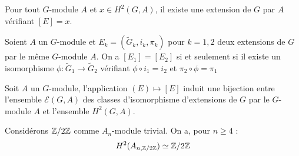 \documentclass{cours}
\begin{document}
\begin{proposition}
    Pour tout $G$-module $A$ et $x \in H^{2}(G, A)$, il existe une extension de $G$ par $A$ vérifiant $\left[E\right] = x$. 
\end{proposition}
\begin{proposition}
    Soient $A$ un $G$-module et $E_{k} = \left(\tilde{G}_{k}, i_{k}, \pi_{k}\right)$ pour $k = 1, 2$ deux extensions de $G$ par le même $G$-module $A$. On a $\left[E_{1}\right] = \left[E_{2}\right]$ si et seulement si il existe un isomorphisme $\phi : \tilde{G}_{1} \rightarrow \tilde{G}_{2}$ vérifiant $\phi \circ i_{1} = i_{2}$ et $\pi_{2} \circ \phi = \pi_{1}$
\end{proposition}
\begin{corollary}
    Soit $A$ un $G$-module, l'application $(E) \mapsto \left[E\right]$ induit une bijection entre l'ensemble $\mathcal{E}(G, A)$ des classes d'isomorphisme d'extensions de $G$ par le $G$-module $A$ et l'ensemble $H^{2}(G, A)$.
\end{corollary}

\begin{theorem}[Schur]
    Considérons $\mathbb{Z}/2\mathbb{Z}$ comme $A_{n}$-module trivial. On a, pour $n \geq 4$ : 
    \[
        H^{2}(A_{n, \mathbb{Z}/2\mathbb{Z}}) \simeq \mathbb{Z}/2\mathbb{Z}
    \]
\end{theorem}
\end{document}
